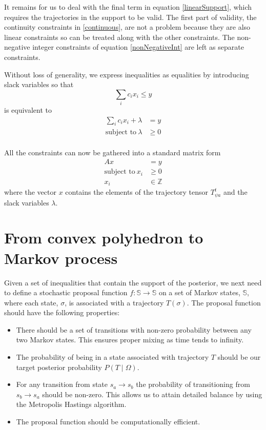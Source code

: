 \documentclass{article}
\begin{document}
It remains for us to deal with the final term in equation \ref{linearSupport}, which requires the trajectories in the support to be valid. The first part of validity, the continuity constraints in \ref{continuous}, are not a problem because they are also linear constraints so can be treated along with the other constraints. The non-negative integer constraints of equation \ref{nonNegativeInt} are left as separate constraints.

Without loss of generality, we express inequalities as equalities by introducing slack variables so that
\[
\sum_i c_i x_i \le y
\]
is equivalent to
\[
\begin{split}
 \sum_i c_i x_i + \lambda & = y \\
\text{subject to}\ \lambda & \ge 0 \\
\end{split}
\]

All the constraints can now be gathered into a standard matrix form
\begin{equation}
\begin{split}
Ax &= y \\
\text{subject to}\ x_i &\ge 0\\
x_i &\in \mathbb{Z}
\end{split}
\label{Axy}
\end{equation}
where the vector $x$ contains the elements of the trajectory tensor $T^t_{\psi a}$ and the slack variables $\lambda$.

\section{From convex polyhedron to Markov process}

Given a set of inequalities that contain the support of the posterior, we next need to define a stochastic proposal function $f:\mathbb{S} \to \mathbb{S}$ on a set of Markov states, $\mathbb{S}$, where each state, $\sigma$, is associated with a trajectory $T(\sigma)$. The proposal function should have the following properties:
\begin{itemize}
\item There should be a set of transitions with non-zero probability between any two Markov states. This ensures proper mixing as time tends to infinity.

\item The probability of being in a state associated with trajectory $T$ should be our target posterior probability $P(T \mid \Omega)$.

\item For any transition from state $s_a \to s_b$ the probability of transitioning from $s_b \to s_a$ should be non-zero. This allows us to attain detailed balance by using the Metropolis Hastings algorithm.

\item The proposal function should be computationally efficient. 
\end{itemize}
\end{document}
